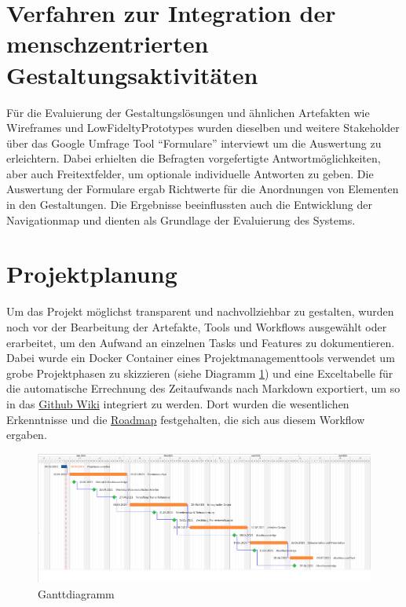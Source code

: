 \section{Verfahren zur Integration der menschzentrierten Gestaltungsaktivitäten}     
Für die Evaluierung der Gestaltungslösungen und ähnlichen Artefakten wie Wireframes und LowFideltyPrototypes wurden dieselben und weitere Stakeholder über das Google Umfrage Tool {``Formulare''} interviewt um die Auswertung zu erleichtern. Dabei erhielten die Befragten vorgefertigte Antwortmöglichkeiten, aber auch Freitextfelder, um optionale individuelle Antworten zu geben. Die Auswertung der Formulare ergab Richtwerte für die Anordnungen von Elementen in den Gestaltungen. Die Ergebnisse beeinflussten auch die Entwicklung der Navigationmap und dienten als Grundlage der Evaluierung des Systems.

\section{Projektplanung}
Um das Projekt möglichst transparent und nachvollziehbar zu gestalten, wurden noch vor der Bearbeitung der Artefakte, Tools und Workflows ausgewählt oder erarbeitet, um den Aufwand an einzelnen Tasks und Features zu dokumentieren. Dabei wurde ein Docker Container eines Projektmanagementtools verwendet um grobe Projektphasen zu skizzieren (siehe Diagramm \ref{fig:ganttdiagramm}) und eine Exceltabelle für die automatische Errechnung des Zeitaufwands nach Markdown exportiert, um so in das \href{https://github.com/Inf166/PPSS21Mai/wiki}{Github Wiki} integriert zu werden. Dort wurden die wesentlichen Erkenntnisse und die \href{https://github.com/Inf166/PPSS21Mai/wiki/Roadmap}{Roadmap} festgehalten, die sich aus diesem Workflow ergaben.\\

\begin{figure}[h] %
    \includegraphics[width=1\textwidth]{images/ganttdiagramm.png}
    \caption[Ganttdiagramm]{Ganttdiagramm}
    \label{fig:ganttdiagramm}
\end{figure}

